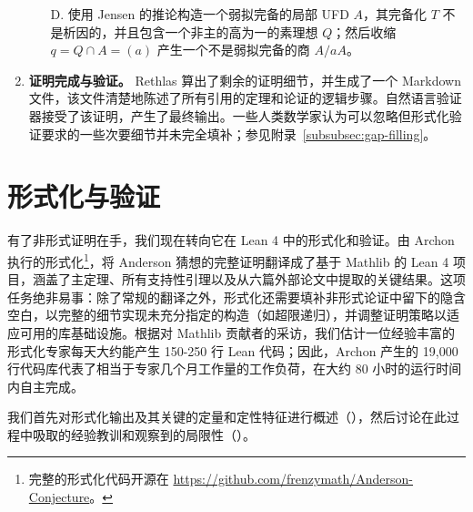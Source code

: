 \begin{enumerate}[leftmargin=*]
    \begin{enumerate}[leftmargin=*]
        \item[D.] 使用 Jensen 的推论构造一个弱拟完备的局部 UFD \(A\)，其完备化 \(T\) 不是析因的，并且包含一个非主的高为一的素理想 \(Q\)；然后收缩 \(q = Q \cap A = (a)\) 产生一个不是弱拟完备的商 \(A/aA\)。
    \end{enumerate}
    \item \textbf{证明完成与验证。} Rethlas 算出了剩余的证明细节，并生成了一个 Markdown 文件，该文件清楚地陈述了所有引用的定理和论证的逻辑步骤。自然语言验证器接受了该证明，产生了最终输出。一些人类数学家认为可以忽略但形式化验证要求的一些次要细节并未完全填补；参见附录~\ref{subsubsec:gap-filling}。
\end{enumerate}

\section{形式化与验证}\label{sec:archon_results}

有了非形式证明在手，我们现在转向它在 Lean 4 中的形式化和验证。由 Archon 执行的形式化\footnote{完整的形式化代码开源在 \url{https://github.com/frenzymath/Anderson-Conjecture}。}，将 Anderson 猜想的完整证明翻译成了基于 Mathlib 的 Lean 4 项目，涵盖了主定理、所有支持性引理以及从六篇外部论文中提取的关键结果。这项任务绝非易事：除了常规的翻译之外，形式化还需要填补非形式论证中留下的隐含空白，以完整的细节实现未充分指定的构造（如超限递归），并调整证明策略以适应可用的库基础设施。根据对 Mathlib 贡献者的采访，我们估计一位经验丰富的形式化专家每天大约能产生 150-250 行 Lean 代码；因此，Archon 产生的 19,000 行代码库代表了相当于专家几个月工作量的工作负荷，在大约 80 小时的运行时间内自主完成。

我们首先对形式化输出及其关键的定量和定性特征进行概述（），然后讨论在此过程中吸取的经验教训和观察到的局限性（）。

